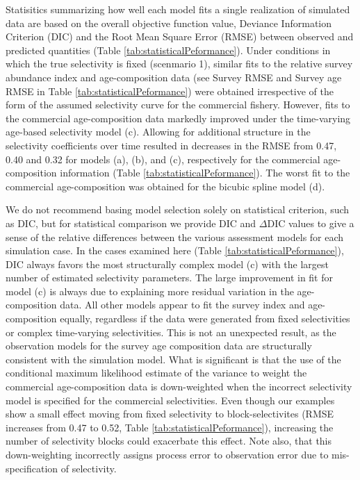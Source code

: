 \documentclass[review,letterpaper,10pt,authoryear]{elsarticle}
\begin{document}
Statisitics summarizing how well each model fits a single realization of simulated data are based on the overall objective function value, Deviance Information Criterion (DIC) and the Root Mean Square Error (RMSE) between observed and predicted quantities (Table \ref{tab:statisticalPeformance}). Under conditions in which the true selectivity is fixed (scenmario 1), similar fits to the relative survey abundance index and age-composition data (see Survey RMSE and Survey age RMSE in Table \ref{tab:statisticalPeformance}) were obtained  irrespective of the form of the assumed selectivity curve for the commercial fishery.  However, fits to the commercial age-composition data markedly improved under the time-varying age-based selectivity model (c).  Allowing for additional structure in the selectivity coefficients over time resulted in decreases in the RMSE from 0.47, 0.40 and 0.32 for models (a), (b), and (c), respectively for the commercial age-composition information (Table \ref{tab:statisticalPeformance}).  The worst fit to the commercial age-composition was obtained for the bicubic spline model (d).

We do not recommend basing model selection solely on statistical criterion, such as DIC, but for statistical comparison we provide DIC and $\Delta$DIC values to give a sense of the relative differences between the various assessment models for each simulation case.  In the cases examined here (Table \ref{tab:statisticalPeformance}), DIC always favors the most structurally complex model (c) with the largest number of estimated selectivity parameters. The large improvement in fit for model (c) is always due to explaining more residual variation in the age-composition data. All other models appear to fit the survey index and age-composition equally, regardless if the data were generated from fixed selectivities or complex time-varying selectivities.  This is not an unexpected result, as the observation models for the survey age composition data are structurally consistent with the simulation model.  What is significant is that the use of the conditional maximum likelihood estimate of the variance to weight the commercial age-composition data is down-weighted when the incorrect selectivity model is specified for the commercial selectivities. Even though our examples show a small effect moving from fixed selectivity to block-selectivites (RMSE increases from 0.47 to 0.52, Table \ref{tab:statisticalPeformance}), increasing the number of selectivity blocks could exacerbate this effect. Note also, that this down-weighting incorrectly assigns process error to observation error due to mis-specification of selectivity.
\end{document}
